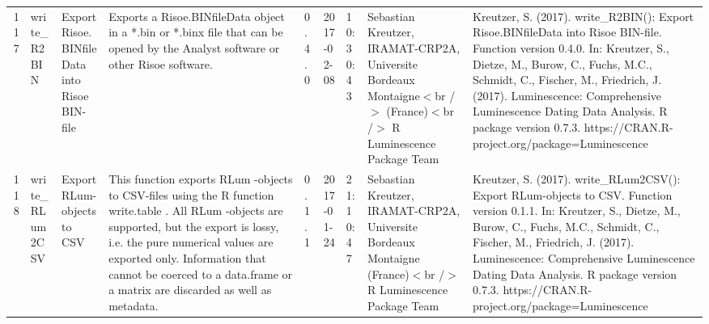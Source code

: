 \begin{table}[ht]
\begin{tabular}{rllllllll}
 \\ 
  117 & write\_R2BIN & Export Risoe.BINfileData into Risoe BIN-file & Exports a Risoe.BINfileData object in a *.bin or *.binx file that can be opened by the Analyst software or other Risoe software. & 0.4.0 & 2017-02-08 & 10:30:43
 & Sebastian Kreutzer, IRAMAT-CRP2A, Universite Bordeaux Montaigne$<$br /$>$ (France)$<$br /$>$  R Luminescence Package Team & Kreutzer, S. (2017). write\_R2BIN(): Export Risoe.BINfileData into Risoe BIN-file. Function version 0.4.0. In: Kreutzer, S., Dietze, M., Burow, C., Fuchs, M.C., Schmidt, C., Fischer, M., Friedrich, J. (2017). Luminescence: Comprehensive Luminescence Dating Data Analysis. R package version 0.7.3. https://CRAN.R-project.org/package=Luminescence
 \\ 
  118 & write\_RLum2CSV & Export RLum-objects to CSV & This function exports  RLum -objects to CSV-files using the R function write.table . All  RLum -objects are supported, but the export is lossy, i.e. the pure numerical values are exported only. Information that cannot be coerced to a  data.frame  or a  matrix  are discarded as well as metadata. & 0.1.1 & 2017-01-24 & 21:10:47
 & Sebastian Kreutzer, IRAMAT-CRP2A, Universite Bordeaux Montaigne (France)$<$br /$>$  R Luminescence Package Team & Kreutzer, S. (2017). write\_RLum2CSV(): Export RLum-objects to CSV. Function version 0.1.1. In: Kreutzer, S., Dietze, M., Burow, C., Fuchs, M.C., Schmidt, C., Fischer, M., Friedrich, J. (2017). Luminescence: Comprehensive Luminescence Dating Data Analysis. R package version 0.7.3. https://CRAN.R-project.org/package=Luminescence
 \\ 
   \hline
\end{tabular}
\end{table}

